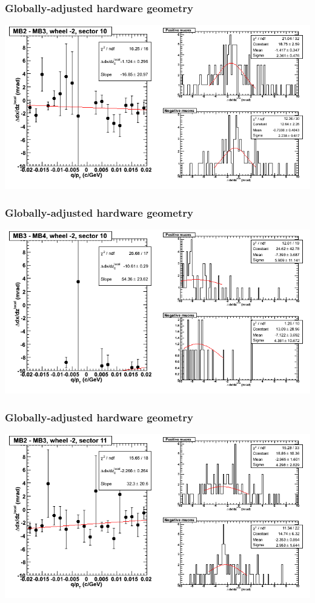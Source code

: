 \documentclass[compress]{beamer}
\begin{document}
\begin{frame}
\frametitle{Globally-adjusted hardware geometry}
\includegraphics[width=\linewidth]{NOV4_segdiffs_HW/dt13_slope_A_10_23.png}
\end{frame}

\begin{frame}
\frametitle{Globally-adjusted hardware geometry}
\includegraphics[width=\linewidth]{NOV4_segdiffs_HW/dt13_slope_A_10_34.png}
\end{frame}

\begin{frame}
\frametitle{Globally-adjusted hardware geometry}
\includegraphics[width=\linewidth]{NOV4_segdiffs_HW/dt13_slope_A_11_23.png}
\end{frame}
\end{document}
